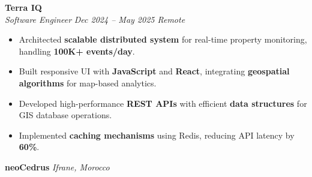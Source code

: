 \documentclass[a4paper, 10pt]{article}
\begin{document}
\textbf{Terra IQ} \\
\textit{Software Engineer} \hfill \textit{Dec 2024 -- May 2025 \textbar{} Remote}
\begin{itemize}[leftmargin=10pt, itemsep=-1pt, topsep=2pt]
\item Architected \textbf{scalable distributed system} for real-time property monitoring, handling \textbf{100K+ events/day}.
\item Built responsive UI with \textbf{JavaScript} and \textbf{React}, integrating \textbf{geospatial algorithms} for map-based analytics.
\item Developed high-performance \textbf{REST APIs} with efficient \textbf{data structures} for GIS database operations.
\item Implemented \textbf{caching mechanisms} using Redis, reducing API latency by \textbf{60\%}.
\end{itemize}

\textbf{neoCedrus} \hfill \textit{ Ifrane, Morocco}
\end{document}
